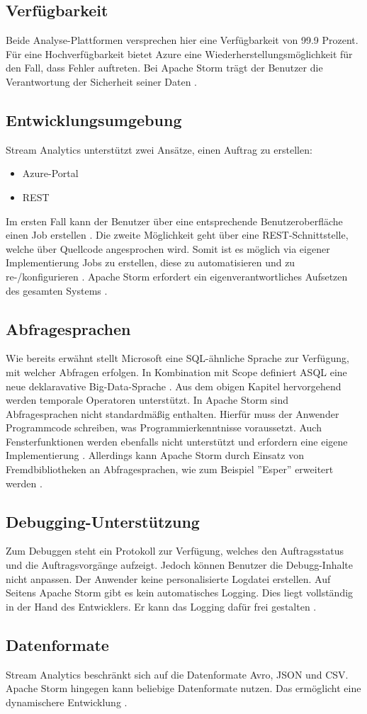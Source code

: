 \subsection{Verfügbarkeit}
Beide Analyse-Plattformen versprechen hier eine Verfügbarkeit von 99.9 Prozent. Für eine Hochverfügbarkeit bietet Azure eine Wiederherstellungsmöglichkeit für den Fall, dass Fehler auftreten. Bei Apache Storm  trägt der Benutzer die Verantwortung der Sicherheit seiner Daten \cite{samacha.2017} \cite{apachescale.2017}. 

\subsection{Entwicklungsumgebung}
Stream Analytics unterstützt zwei Ansätze, einen Auftrag zu erstellen: 
\begin{itemize} 
	\item Azure-Portal
	\item REST
\end{itemize}
Im ersten Fall kann der Benutzer über eine entsprechende Benutzeroberfläche einen Job erstellen \cite{jeffstokes72.19.12.2017}. Die zweite Möglichkeit geht über eine REST-Schnittstelle, welche über Quellcode angesprochen wird. Somit ist es möglich via eigener Implementierung Jobs zu erstellen, diese zu automatisieren und zu re-/konfigurieren \cite{samacha.19.12.2017}. Apache Storm erfordert ein eigenverantwortliches Aufsetzen des gesamten Systems \cite{apache.2017}. 

\subsection{Abfragesprachen} \label{absprache}
Wie bereits erwähnt stellt Microsoft eine SQL-ähnliche Sprache zur Verfügung, mit welcher Abfragen erfolgen. In Kombination mit Scope definiert ASQL eine neue deklaravative Big-Data-Sprache \cite{sql.2016}. Aus dem obigen Kapitel hervorgehend werden temporale Operatoren unterstützt. In Apache Storm sind Abfragesprachen nicht standardmäßig enthalten. Hierfür muss der Anwender Programmcode schreiben, was Programmierkenntnisse voraussetzt. Auch Fensterfunktionen werden ebenfalls nicht unterstützt und erfordern eine eigene Implementierung \cite{samacha.2017}. Allerdings kann Apache Storm durch Einsatz von Fremdbibliotheken an Abfragesprachen, wie zum Beispiel ''Esper'' erweitert werden \cite{esper.2016}.

\subsection{Debugging-Unterstützung} \label{Debugging}
Zum Debuggen steht ein Protokoll zur Verfügung, welches den Auftragsstatus und die Auftragsvorgänge aufzeigt. Jedoch können Benutzer die Debugg-Inhalte nicht anpassen. Der Anwender keine personalisierte Logdatei erstellen. Auf Seitens Apache Storm gibt es kein automatisches Logging. Dies liegt vollständig in der Hand des Entwicklers. Er kann das Logging dafür frei gestalten \cite{apachedebugging.2106}.

\subsection{Datenformate}
Stream Analytics beschränkt sich auf die Datenformate Avro, JSON und CSV. Apache Storm hingegen kann beliebige Datenformate nutzen. Das ermöglicht eine dynamischere Entwicklung \cite{Klein.2017}. 

